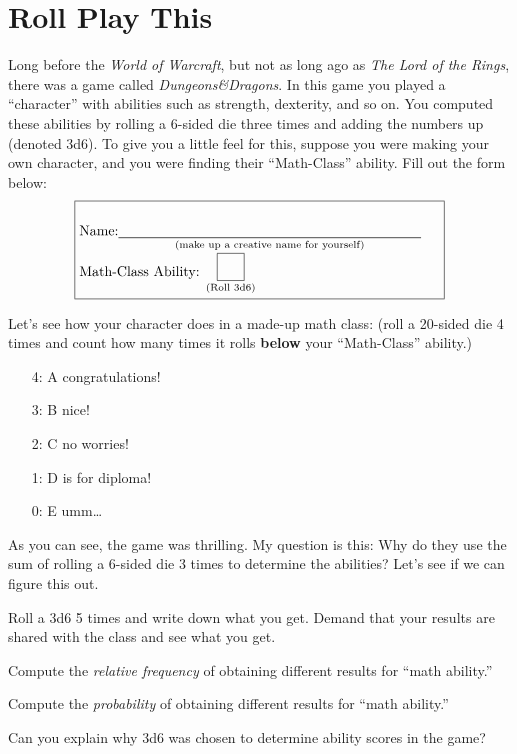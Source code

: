 \newpage
\section{Roll Play This}

Long before the \textit{World of Warcraft}, but not as long ago
as \textit{The Lord of the Rings}, there was a game
called \textit{Dungeons\&Dragons}. In this game you played a
``character'' with abilities such as strength, dexterity, and so
on. You computed these abilities by rolling a 6-sided die three times
and adding the numbers up (denoted 3d6). To give you a little feel for this, suppose
you were making your own character, and you were finding their
``Math-Class'' ability. Fill out the form below:
\[
\fbox{\begin{minipage}{60ex}
\vspace{.5cm}
Name:$\underset{\text{(make up a creative name for yourself)}}{\protect\rule[-2pt]{3in}{.5pt}}$\hfill\\
Math-Class Ability: $\underset{\text{(Roll 3d6)}}{\fbox{\rule[0mm]{0mm}{3ex}\hspace{3ex}}}$ 
\end{minipage}}
\]


Let's see how your character does in a made-up math class: (roll a
20-sided die 4 times and count how many times it rolls \textbf{below}
your ``Math-Class'' ability.)
\begin{itemize}
\item[4:] A congratulations!
\item[3:] B nice!
\item[2:] C no worries!
\item[1:] D is for diploma!
\item[0:] E umm\dots
\end{itemize}

As you can see, the game was thrilling. My question is this: Why do
they use the sum of rolling a 6-sided die 3 times to determine
the abilities? Let's see if we can figure this out.

\begin{prob}
Roll a 3d6 5 times and write down what you get. Demand that your
results are shared with the class and see what you get.
\end{prob}


\begin{prob}
Compute the \textit{relative frequency} of obtaining different results
for ``math ability.''
\end{prob}


\begin{prob}
Compute the \textit{probability} of obtaining different results
for ``math ability.''
\end{prob}

\begin{prob}
Can you explain why 3d6 was chosen to determine ability scores in the
game?
\end{prob}


